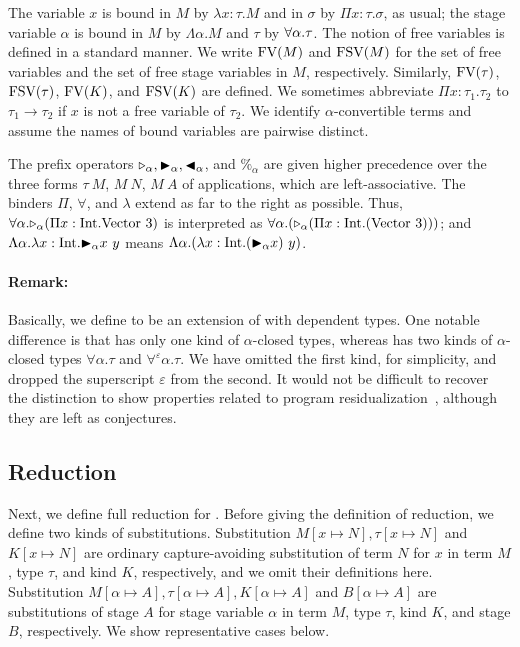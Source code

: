 
The variable $x$ is bound in $M$ by $\lambda x:\tau.M$ and in $\sigma$ by $\Pi
x:\tau.\sigma$, as usual; the stage variable $\alpha$ is bound in $M$ by
$\Lambda \alpha.M$ and $\tau$ by $\forall\alpha.\tau$.  The notion of free variables
is defined in a standard manner.  We write $\text{FV}(M)$ and $\text{FSV}(M)$ for the set
of free variables and the set of free stage variables in $M$, respectively.
Similarly, $\text{FV}(\tau)$, $\text{FSV}(\tau)$, $\text{FV}(K)$, and $\text{FSV}(K)$ are defined.  We
sometimes abbreviate $\Pi x:\tau_1.\tau_2$ to $\tau_1 \rightarrow \tau_2$ if
$x$ is not a free variable of $\tau_2$.  We identify $\alpha$-convertible terms
and assume the names of bound variables are pairwise distinct.


The prefix operators ${\mathop{\triangleright}}_\alpha, {\mathop{\blacktriangleright}}_\alpha, {\mathop{\blacktriangleleft}}_\alpha$, and $\%_\alpha$ are
given higher precedence over the three forms $\tau\ M$, $M\ N$, $M\ A$ of
applications, which are left-associative. The binders $\Pi$, $\forall$, and
$\lambda$ extend as far to the right as possible.  Thus, $\forall\alpha.{\mathop{\triangleright}}_{\alpha}
(\Pi x:\textrm{Int}.\text{Vector}\ 3)$ is interpreted as $\forall\alpha.({\mathop{\triangleright}}_{\alpha} (\Pi
x:\textrm{Int}.(\text{Vector}\ 3)))$; and $\Lambda\alpha.\lambda x:\textrm{Int}.{\mathop{\blacktriangleright}}_\alpha x\ y$
means $\Lambda\alpha.(\lambda x:\textrm{Int}.({\mathop{\blacktriangleright}}_\alpha x)\ y)$.


\paragraph{Remark:} Basically, we define \LMD to be an extension of \LTP with
dependent types. One notable difference is that \LMD has only one kind of
\(\alpha\)-closed types, whereas \LTP has two kinds of \(\alpha\)-closed types
\(\forall\alpha.\tau\) and \(\forall^\varepsilon\alpha.\tau\).  We have omitted
the first kind, for simplicity, and dropped the superscript $\varepsilon$ from
the second. It would not be difficult to recover the distinction to show
properties related to program residualization~\cite{HanadaIgarashi2014CSP}, although they
are left as conjectures.

\subsection{Reduction}


Next, we define full reduction for \LMD.  Before giving the definition of
reduction, we define two kinds of substitutions. Substitution $M[x\mapsto N],
\tau[x \mapsto N]$ and $K[x \mapsto N]$ are ordinary capture-avoiding
substitution of term $N$ for $x$ in term $M$, type $\tau$, and kind $K$,
respectively, and we omit their definitions here.  Substitution $M[\alpha
\mapsto A], \tau [\alpha \mapsto A], K[\alpha \mapsto A]$ and $B[\alpha\mapsto
A]$ are substitutions of stage $A$ for stage variable $\alpha$ in term $M$,
type $\tau$, kind $K$, and stage $B$, respectively.  We show representative
cases below.

